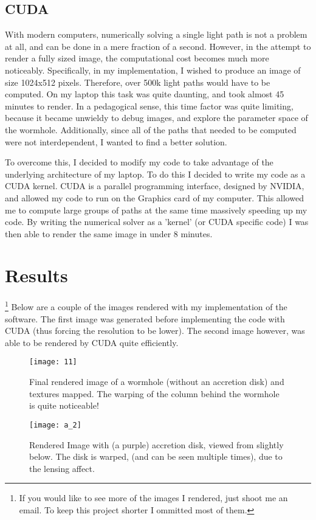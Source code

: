 \documentclass{article}
\begin{document}
\subsection{CUDA}
  With modern computers, numerically solving a single light path is not a problem at all, and can be done in a mere fraction of a second. However, in the attempt to render a fully sized image, the computational cost becomes much more noticeably. Specifically, in my implementation, I wished to produce an image of size 1024x512 pixels. Therefore, over 500k light paths would have to be computed. On my laptop this task was quite daunting, and took almost 45 minutes to render. In a pedagogical sense, this time factor was quite limiting, because it became unwieldy to debug images, and explore the parameter space of the wormhole. Additionally, since all of the paths that needed to be computed were not interdependent, I wanted to find a better solution. \par
  To overcome this, I decided to modify my code to take advantage of the underlying architecture of my laptop. To do this I decided to write my code as a CUDA kernel. CUDA is a parallel programming interface, designed by NVIDIA, and allowed my code to run on the Graphics card of my computer. This allowed me to compute large groups of paths at the same time massively speeding up my code. By writing the numerical solver as a 'kernel' (or CUDA specific code) I was then able to render the same image in under 8 minutes. \par
\section{Results}\footnote{If you would like to see more of the images I rendered, just shoot me an email. To keep this project shorter I ommitted most of them.}
  Below are a couple of the images rendered with my implementation of the software. The first image was generated before implementing the code with CUDA (thus forcing the resolution to be lower). The second image however, was able to be rendered by CUDA quite efficiently. 
\begin{figure}[H]
  \centering
  \texttt{[image: 11]}
  \caption{Final rendered image of a wormhole (without an accretion disk) and textures mapped. The warping of the column behind the wormhole is quite noticeable!}
  \label{fig:mine}
\end{figure}

\begin{figure}[H]
  \centering
  \texttt{[image: a\_2]}
  \caption{Rendered Image with (a purple) accretion disk, viewed from slightly below. The disk is warped, (and can be seen multiple times), due to the lensing affect.}
  \label{fig:mine}
\end{figure}
\end{document}
